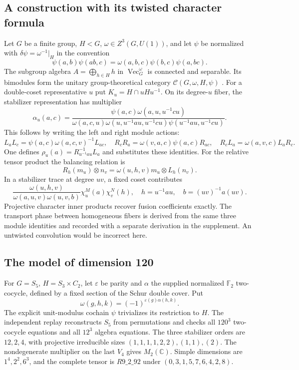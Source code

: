 \documentclass[11pt,a4paper]{article}
\theoremstyle{remark}\newtheorem{remark}[theorem]{Remark}
\renewcommand{\Vec}{\operatorname{Vec}}\newcommand{\Irr}{\operatorname{Irr}}
\newcommand{\C}{\mathbb C}\newcommand{\Q}{\mathbb Q}\newcommand{\Z}{\mathbb Z}
\begin{document}
\subsection{A construction with its twisted character formula}
Let $G$ be a finite group, $H<G$, $\omega\in Z^3(G,U(1))$, and let
$\psi$ be normalized with $\delta\psi=\omega^{-1}|_H$ in the convention
\[
 \psi(a,b)\psi(ab,c)=\omega(a,b,c)\psi(b,c)\psi(a,bc).
\]
The subgroup algebra $A=\bigoplus_{h\in H}h$ in $\Vec_G^\omega$ is
connected and separable. Its bimodules form the unitary group-theoretical
category $\mathcal C(G,\omega,H,\psi)$ \cite{ENO,GHR}.
For a double-coset representative $u$ put $K_u=H\cap uHu^{-1}$.
On its degree-$u$ fiber, the stabilizer representation has multiplier
\[
 \alpha_u(a,c)=
 \frac{\psi(a,c)\omega(a,u,u^{-1}cu)}
 {\omega(a,c,u)\omega(u,u^{-1}au,u^{-1}cu)
 \psi(u^{-1}au,u^{-1}cu)}.
\]
This follows by writing the left and right module actions:
\[
 L_aL_c=\psi(a,c)\omega(a,c,v)^{-1}L_{ac},\quad
 R_cR_a=\omega(v,a,c)\psi(a,c)R_{ac},\quad
 R_cL_a=\omega(a,v,c)L_aR_c.
\]
One defines $\rho_u(a)=R_{u^{-1}au}^{-1}L_a$ and substitutes these identities.
For the relative tensor product the balancing relation is
\[
 R_h(m_u)\otimes n_v=\omega(u,h,v)m_u\otimes L_h(n_v).
\]
In a stabilizer trace at degree $uv$, a fixed coset contributes
\[
 \frac{\omega(u,h,v)}{\omega(a,u,v)\omega(u,v,b)}
 \chi_u^M(a)\chi_v^N(h),\quad
 h=u^{-1}au,\quad b=(uv)^{-1}a(uv).
\]
Projective character inner products recover fusion coefficients exactly.
The transport phase between homogeneous fibers is derived from the same
three module identities and recorded with a separate derivation in the
supplement. An untwisted convolution would be incorrect here.

\subsection{The model of dimension 120}
For $G=S_5$, $H=S_3\times C_2$, let $\varepsilon$ be parity and
$\alpha$ the supplied normalized $\mathbb F_2$ two-cocycle, defined by
a fixed section of the Schur double cover. Put
\[
 \omega(g,h,k)=(-1)^{\varepsilon(g)\alpha(h,k)}.
\]
The explicit unit-modulus cochain $\psi$ trivializes its restriction to
$H$. The independent replay reconstructs $S_5$ from permutations and
checks all $120^3$ two-cocycle equations and all $12^3$ algebra equations.
The three stabilizer orders are $12,2,4$, with projective irreducible
sizes $(1,1,1,1,2,2),(1,1),(2)$. The nondegenerate multiplier on the last
$V_4$ gives $M_2(\C)$. Simple dimensions are $1^4,2^2,6^3$, and the complete
tensor is $R9\_2\_92$ under $(0,3,1,5,7,6,4,2,8)$.
\end{document}
